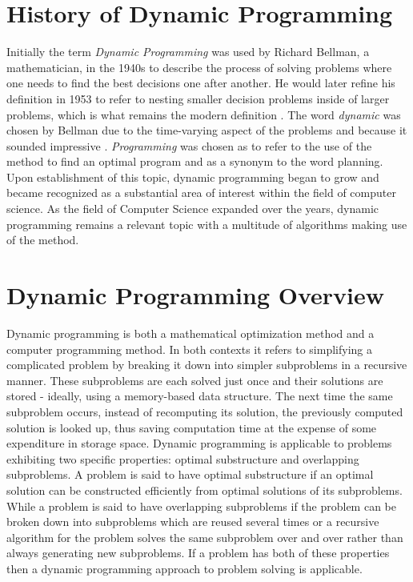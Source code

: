 \section{History of Dynamic Programming}
Initially the term \textit{Dynamic Programming} was used by Richard Bellman, a mathematician, in the 1940s to describe the process of solving problems where one needs to find the best decisions one after another. He would later refine his definition in 1953 to refer to nesting smaller decision problems inside of larger problems, which is what remains the modern definition \cite{bellman}. The word \textit{dynamic} was chosen by Bellman due to the time-varying aspect of the problems and because it sounded impressive \cite{dynamic}. \textit{Programming} was chosen as to refer to the use of the method to find an optimal program and as a synonym to the word planning. Upon establishment of this topic, dynamic programming began to grow and became recognized as a substantial area of interest within the field of computer science. As the field of Computer Science expanded over the years, dynamic programming remains a relevant topic with a multitude of algorithms making use of the method.

\section{Dynamic Programming Overview}
Dynamic programming is both a mathematical optimization method and a computer programming method. In both contexts it refers to simplifying a complicated problem by breaking it down into simpler subproblems in a recursive manner. These subproblems are each solved just once and their solutions are stored - ideally, using a memory-based data structure. The next time the same subproblem occurs, instead of recomputing its solution, the previously computed solution is looked up, thus saving computation time at the expense of some expenditure in storage space\cite{dynamic-wiki}. Dynamic programming is applicable to problems exhibiting two specific properties: optimal substructure and overlapping subproblems.
\smallbreak
A problem is said to have optimal substructure if an optimal solution can be constructed efficiently from optimal solutions of its subproblems\cite{design-manual}. While a problem is said to have overlapping subproblems if the problem can be broken down into subproblems which are reused several times or a recursive algorithm for the problem solves the same subproblem over and over rather than always generating new subproblems\cite{IntroAlgo}. If a problem has both of these properties then a dynamic programming approach to problem solving is applicable. 

